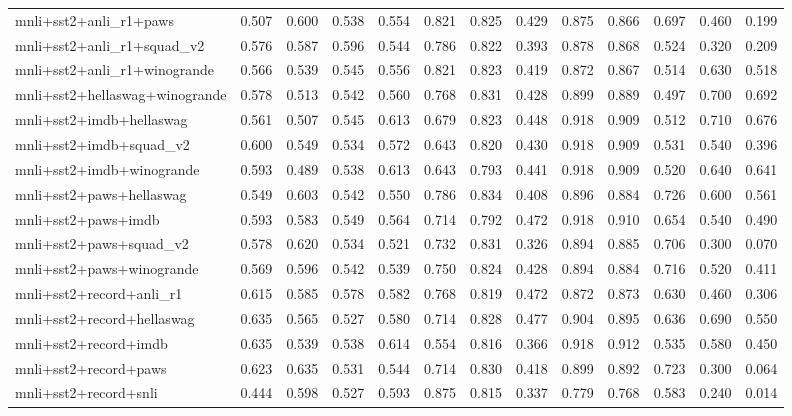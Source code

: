\begin{table}[t]
\begin{tabular}{lrrrrrrrrrrrr}
    mnli+sst2+anli\_r1+paws & 0.507 & 0.600 & 0.538 & 0.554 & 0.821 & 0.825 & 0.429 & 0.875 & 0.866 & 0.697 & 0.460 & 0.199 \\
    mnli+sst2+anli\_r1+squad\_v2 & 0.576 & 0.587 & 0.596 & 0.544 & 0.786 & 0.822 & 0.393 & 0.878 & 0.868 & 0.524 & 0.320 & 0.209 \\
    mnli+sst2+anli\_r1+winogrande & 0.566 & 0.539 & 0.545 & 0.556 & 0.821 & 0.823 & 0.419 & 0.872 & 0.867 & 0.514 & 0.630 & 0.518 \\
    mnli+sst2+hellaswag+winogrande & 0.578 & 0.513 & 0.542 & 0.560 & 0.768 & 0.831 & 0.428 & 0.899 & 0.889 & 0.497 & 0.700 & 0.692 \\
    mnli+sst2+imdb+hellaswag & 0.561 & 0.507 & 0.545 & 0.613 & 0.679 & 0.823 & 0.448 & 0.918 & 0.909 & 0.512 & 0.710 & 0.676 \\
    mnli+sst2+imdb+squad\_v2 & 0.600 & 0.549 & 0.534 & 0.572 & 0.643 & 0.820 & 0.430 & 0.918 & 0.909 & 0.531 & 0.540 & 0.396 \\
    mnli+sst2+imdb+winogrande & 0.593 & 0.489 & 0.538 & 0.613 & 0.643 & 0.793 & 0.441 & 0.918 & 0.909 & 0.520 & 0.640 & 0.641 \\
    mnli+sst2+paws+hellaswag & 0.549 & 0.603 & 0.542 & 0.550 & 0.786 & 0.834 & 0.408 & 0.896 & 0.884 & 0.726 & 0.600 & 0.561 \\
    mnli+sst2+paws+imdb & 0.593 & 0.583 & 0.549 & 0.564 & 0.714 & 0.792 & 0.472 & 0.918 & 0.910 & 0.654 & 0.540 & 0.490 \\
    mnli+sst2+paws+squad\_v2 & 0.578 & 0.620 & 0.534 & 0.521 & 0.732 & 0.831 & 0.326 & 0.894 & 0.885 & 0.706 & 0.300 & 0.070 \\
    mnli+sst2+paws+winogrande & 0.569 & 0.596 & 0.542 & 0.539 & 0.750 & 0.824 & 0.428 & 0.894 & 0.884 & 0.716 & 0.520 & 0.411 \\
    mnli+sst2+record+anli\_r1 & 0.615 & 0.585 & 0.578 & 0.582 & 0.768 & 0.819 & 0.472 & 0.872 & 0.873 & 0.630 & 0.460 & 0.306 \\
    mnli+sst2+record+hellaswag & 0.635 & 0.565 & 0.527 & 0.580 & 0.714 & 0.828 & 0.477 & 0.904 & 0.895 & 0.636 & 0.690 & 0.550 \\
    mnli+sst2+record+imdb & 0.635 & 0.539 & 0.538 & 0.614 & 0.554 & 0.816 & 0.366 & 0.918 & 0.912 & 0.535 & 0.580 & 0.450 \\
    mnli+sst2+record+paws & 0.623 & 0.635 & 0.531 & 0.544 & 0.714 & 0.830 & 0.418 & 0.899 & 0.892 & 0.723 & 0.300 & 0.064 \\
    mnli+sst2+record+snli & 0.444 & 0.598 & 0.527 & 0.593 & 0.875 & 0.815 & 0.337 & 0.779 & 0.768 & 0.583 & 0.240 & 0.014 \\

\end{tabular}
\end{table}
